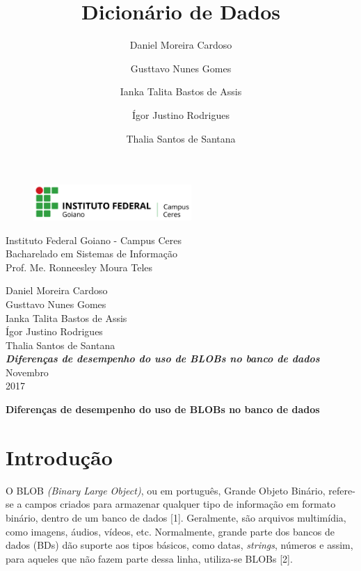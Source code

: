 \documentclass[12pt,a4paper]{article}
\title{Dicionário de Dados}
\author{Daniel Moreira Cardoso \and Gusttavo Nunes Gomes\and Ianka Talita Bastos de Assis\and Ígor Justino Rodrigues \and Thalia Santos de Santana}
\begin{document}
\begin{titlepage}
\begin{center}
\begin{figure}[htb]
                
                \label{figura:LogoIF}
        
                \centering
                \includegraphics[width=6cm]{recursos/imagens/logo.png} 
\end{figure}
Instituto Federal Goiano - Campus Ceres\\
Bacharelado em Sistemas de Informação\\
Prof. Me. Ronneesley Moura Teles\\\vspace{1cm}

Daniel Moreira Cardoso \\ 
Gusttavo Nunes Gomes \\ 
Ianka Talita Bastos de Assis \\ 
Ígor Justino Rodrigues \\ 
Thalia Santos de Santana\\
\vspace{6.0cm}
\textit{\textbf{\Large{Diferenças de desempenho do uso de BLOBs no banco de dados}}}\\\vspace{10cm}
Novembro\\
2017\\
\end{center}
\end{titlepage}
\tableofcontents
\newpage
\begin{center}
\textbf{\Large{Diferenças de desempenho do uso de BLOBs no banco de dados}}\\\vspace{0.5cm}
\end{center}
\section{Introdução}
O BLOB \textit{(Binary Large Object)}, ou em português, Grande Objeto Binário, refere-se a campos criados para armazenar qualquer tipo de informação em formato binário, dentro de um banco de dados [1]. Geralmente, são arquivos multimídia, como imagens, áudios, vídeos, etc. Normalmente, grande parte dos bancos de dados (BDs) dão suporte aos tipos básicos, como datas, \textit{strings}, números e assim, para aqueles que não fazem parte dessa linha, utiliza-se BLOBs [2].
\end{document}
